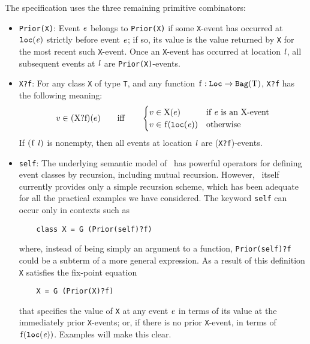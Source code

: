 \documentclass[final]{article}
\newcommand{\dgclassrel}[3]{\NUPRLclassrel{}{#1}{}{#2}{#3}}
\newcommand{\listinline}[1]{\text{\lstinline{#1}}}
\begin{document}

The specification uses the three remaining primitive combinators:
\begin{itemize}
\item
  \lstinline{Prior(X)}:%
  Event $\mathit{e}$ belongs to \lstinline{Prior(X)} if some
  \lstinline{X}-event has occurred at $\mathtt{loc}(\mathit{e})$
  strictly before event $\mathit{e}$; if so, its value is the value
  returned by \lstinline{X} for the most recent such
  \lstinline{X}-event.  Once an \lstinline{X}-event has occurred at
  location $\mathit{l}$, all subsequent events at $\mathit{l}$ are
  \lstinline{Prior(X)}-events.

\item
  \lstinline{X?f}:%
  For any class \lstinline{X} of type \lstinline{T}, and any function
  $\listinline{f}:\NUPRLarrow{\NUPRLloc}{\NUPRLbag{\listinline{T}}}$,
  \lstinline{X?f} has the following meaning:
  \[
  \dgclassrel{e}{\listinline{(X?f)}}{v} \qquad \text{iff} \qquad
  \begin{cases}
    \dgclassrel{e}{\listinline{X}}{v} &
    \text{if $\NUPRLevent$ is an \listinline{X}-event} \\
    v \in \listinline{f}(\NUPRLesloc{}{\NUPRLevent}) &
    \text{otherwise}
  \end{cases}
  \]
  If $(\listinline{f}~\NUPRL{l})$ is nonempty, then all events at
  location $\mathit{l}$ are (\lstinline{X?f})-events.

\item
  \lstinline{self}:%
  The underlying semantic model of \eml\ has powerful operators for
  defining event classes by recursion, including mutual recursion.
  However, \eml\ itself currently provides only a simple recursion
  scheme, which has been adequate for all the practical examples we have
  considered.  The keyword \lstinline{self} can occur only in contexts
  such as
  \begin{lstlisting}
    class X = G (Prior(self)?f)
  \end{lstlisting}
  where, instead of being simply an argument to a function,
  \lstinline{Prior(self)?f} could be a subterm of a more general
  expression.  As a result of this definition \lstinline{X} satisfies
  the fix-point equation
  \begin{lstlisting}
    X = G (Prior(X)?f)
  \end{lstlisting}
  that specifies the value of \lstinline{X} at any event $\mathit{e}$
  in terms of its value at the immediately prior \lstinline{X}-events;
  or, if there is no prior \lstinline{X}-event, in terms of
  $\listinline{f}(\NUPRLesloc{}{\NUPRLevent})$.  Examples will make
  this clear.
\end{itemize}
\end{document}
